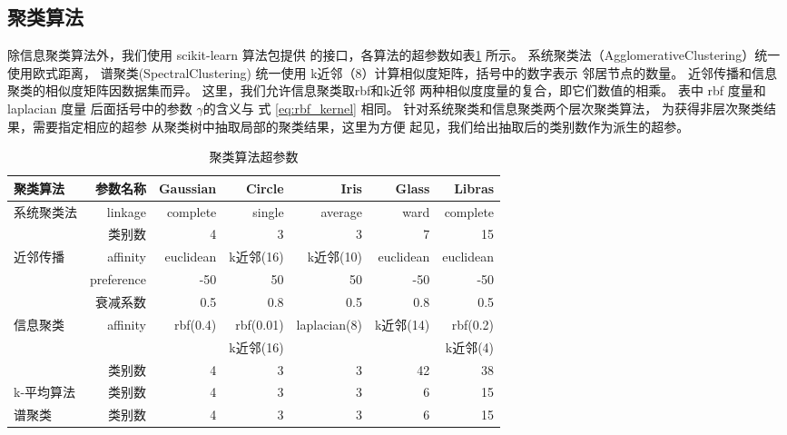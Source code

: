 \subsection{聚类算法}
除信息聚类算法外，我们使用 scikit-learn 算法包提供
的接口，各算法的超参数如表\ref{tab:clustering_alg_hyperparameter}
所示。
系统聚类法（AgglomerativeClustering）统一使用欧式距离，
谱聚类(SpectralClustering)
统一使用 k近邻（8）计算相似度矩阵，括号中的数字表示
邻居节点的数量。
近邻传播和信息聚类的相似度矩阵因数据集而异。
这里，我们允许信息聚类取rbf和k近邻
两种相似度度量的复合，即它们数值的相乘。
表中 rbf 度量和 laplacian 度量
后面括号中的参数 $\gamma$的含义与
式 \ref{eq:rbf_kernel} 相同。
针对系统聚类和信息聚类两个层次聚类算法，
为获得非层次聚类结果，需要指定相应的超参
从聚类树中抽取局部的聚类结果，这里为方便
起见，我们给出抽取后的类别数作为派生的超参。

\begin{table}[!ht]
  \begin{adjustbox}{width=\columnwidth,center}
  \begin{tabular}{|l|r|r|r|r|r|r|}
  \hline
   聚类算法  &   参数名称 & Gaussian &   Circle &   Iris &   Glass &   Libras \\
  \hline
   \multirow{2}{*}{系统聚类法}  &  linkage     &   complete&     single &   average
   & ward &   complete \\
   \cline{2-7}
   & 类别数 & 4 & 3 & 3 & 7 & 15 \\
   \hline
   \multirow{3}{*}{近邻传播}  &    affinity & euclidean &  k近邻(16)
   &  k近邻(10)
   & euclidean &   euclidean \\
   \cline{2-7}
   & preference & -50 & 50 & 50 &
   -50 & -50\\
   \cline{2-7}
   & 衰减系数 & 0.5 & 0.8 & 0.5 & 0.8 & 0.5 \\
   \hline
   \multirow{2}{*}{信息聚类}  & 
   \multirow{2}{*}{affinity}      &       rbf(0.4) &    rbf(0.01)&  laplacian(8) & k近邻(14) &   rbf(0.2) \\
   & & &  k近邻(16)  & && k近邻(4)\\
   \cline{2-7}
   & 类别数 & 4 & 3 & 3 & 42 & 38\\
   \hline
   k-平均算法     &     类别数    &
   4 &    3 &  3 &   6 &    15 \\
   \hline
   谱聚类   &    类别数 & 4 &   3 &    3 &   6 &    15 \\
  \hline
  \end{tabular}
  \end{adjustbox}
\caption{聚类算法超参数}\label{tab:clustering_alg_hyperparameter}
\end{table}
